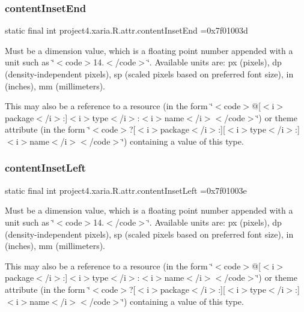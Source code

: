 \subsubsection{\texorpdfstring{content\+Inset\+End}{contentInsetEnd}}
{\footnotesize\ttfamily static final int project4.\+xaria.\+R.\+attr.\+content\+Inset\+End =0x7f01003d\hspace{0.3cm}{\ttfamily [static]}}

Must be a dimension value, which is a floating point number appended with a unit such as \char`\"{}$<$code$>$14.\+5sp$<$/code$>$\char`\"{}. Available units are\+: px (pixels), dp (density-\/independent pixels), sp (scaled pixels based on preferred font size), in (inches), mm (millimeters). 

This may also be a reference to a resource (in the form \char`\"{}$<$code$>$@\mbox{[}$<$i$>$package$<$/i$>$\+:\mbox{]}$<$i$>$type$<$/i$>$\+:$<$i$>$name$<$/i$>$$<$/code$>$\char`\"{}) or theme attribute (in the form \char`\"{}$<$code$>$?\mbox{[}$<$i$>$package$<$/i$>$\+:\mbox{]}\mbox{[}$<$i$>$type$<$/i$>$\+:\mbox{]}$<$i$>$name$<$/i$>$$<$/code$>$\char`\"{}) containing a value of this type. \mbox{\label{classproject4_1_1xaria_1_1R_1_1attr_a978554d076641b7dc7f3e6e13697e19d}} 
\subsubsection{\texorpdfstring{content\+Inset\+Left}{contentInsetLeft}}
{\footnotesize\ttfamily static final int project4.\+xaria.\+R.\+attr.\+content\+Inset\+Left =0x7f01003e\hspace{0.3cm}{\ttfamily [static]}}

Must be a dimension value, which is a floating point number appended with a unit such as \char`\"{}$<$code$>$14.\+5sp$<$/code$>$\char`\"{}. Available units are\+: px (pixels), dp (density-\/independent pixels), sp (scaled pixels based on preferred font size), in (inches), mm (millimeters). 

This may also be a reference to a resource (in the form \char`\"{}$<$code$>$@\mbox{[}$<$i$>$package$<$/i$>$\+:\mbox{]}$<$i$>$type$<$/i$>$\+:$<$i$>$name$<$/i$>$$<$/code$>$\char`\"{}) or theme attribute (in the form \char`\"{}$<$code$>$?\mbox{[}$<$i$>$package$<$/i$>$\+:\mbox{]}\mbox{[}$<$i$>$type$<$/i$>$\+:\mbox{]}$<$i$>$name$<$/i$>$$<$/code$>$\char`\"{}) containing a value of this type. \mbox{\label{classproject4_1_1xaria_1_1R_1_1attr_a2b0cf22b41f484aff6c492f0bf0e3e32}} 
